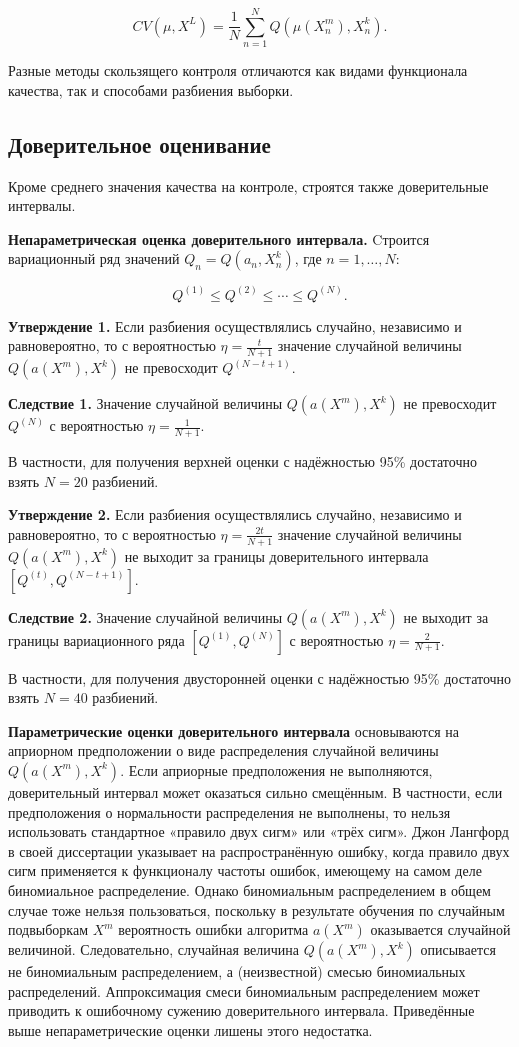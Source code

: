 \[
    CV(\mu, X^L) = \frac{1}{N} \sum_{n=1}^N Q(\mu(X^m_n), X^k_n).
\]

Разные методы скользящего контроля отличаются как видами функционала качества, так и способами разбиения выборки.

\subsection{Доверительное оценивание}

Кроме среднего значения качества на контроле, строятся также доверительные интервалы.

\textbf{Непараметрическая оценка доверительного интервала.}
\newline
Cтроится вариационный ряд значений $Q_n = Q(a_n, X^k_n)$, где $n = 1, \ldots, N$:

\[
    Q^{(1)} \leq Q^{(2)} \leq \cdots \leq Q^{(N)}.
\]

\textbf{Утверждение 1.} Если разбиения осуществлялись случайно, независимо и равновероятно, то с вероятностью $\eta = \frac{t}{N+1}$ значение случайной величины $Q(a(X^m), X^k)$ не превосходит $Q^{(N-t+1)}$.

\textbf{Следствие 1.} Значение случайной величины $Q(a(X^m), X^k)$ не превосходит $Q^{(N)}$ с вероятностью $\eta = \frac{1}{N+1}$.

В частности, для получения верхней оценки с надёжностью 95\% достаточно взять $N=20$ разбиений.

\textbf{Утверждение 2.} Если разбиения осуществлялись случайно, независимо и равновероятно, то с вероятностью $\eta = \frac{2t}{N+1}$ значение случайной величины $Q(a(X^m), X^k)$ не выходит за границы доверительного интервала $\left[ Q^{(t)}, Q^{(N-t+1)} \right]$.

\textbf{Следствие 2.} Значение случайной величины $Q(a(X^m), X^k)$ не выходит за границы вариационного ряда $\left[ Q^{(1)}, Q^{(N)} \right]$ с вероятностью $\eta = \frac{2}{N+1}$.

В частности, для получения двусторонней оценки с надёжностью 95\% достаточно взять $N=40$ разбиений.

\textbf{Параметрические оценки доверительного интервала} основываются на априорном предположении о виде распределения случайной величины $Q(a(X^m), X^k)$. Если априорные предположения не выполняются, доверительный интервал может оказаться сильно смещённым. В частности, если предположения о нормальности распределения не выполнены, то нельзя использовать стандартное «правило двух сигм» или «трёх сигм». Джон Лангфорд в своей диссертации \cite{Langford2002} указывает на распространённую ошибку, когда правило двух сигм применяется к функционалу частоты ошибок, имеющему на самом деле биномиальное распределение. Однако биномиальным распределением в общем случае тоже нельзя пользоваться, поскольку в результате обучения по случайным подвыборкам $X^m$ вероятность ошибки алгоритма $a(X^m)$ оказывается случайной величиной. Следовательно, случайная величина $Q(a(X^m), X^k)$ описывается не биномиальным распределением, а (неизвестной) смесью биномиальных распределений. Аппроксимация смеси биномиальным распределением может приводить к ошибочному сужению доверительного интервала. Приведённые выше непараметрические оценки лишены этого недостатка.

